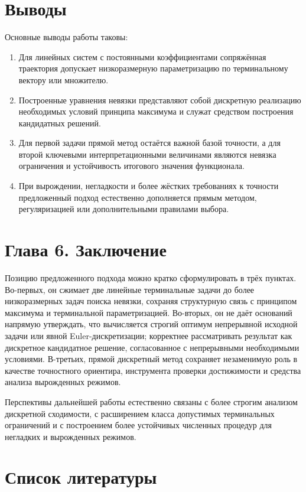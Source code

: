\documentclass[a4paper,12pt]{article}
\begin{document}
\section{Выводы}

Основные выводы работы таковы:
\begin{enumerate}
\item Для линейных систем с постоянными коэффициентами сопряжённая траектория допускает низкоразмерную параметризацию по терминальному вектору или множителю.
\item Построенные уравнения невязки представляют собой дискретную реализацию необходимых условий принципа максимума и служат средством построения кандидатных решений.
\item Для первой задачи прямой метод остаётся важной базой точности, а для второй ключевыми интерпретационными величинами являются невязка ограничения и устойчивость итогового значения функционала.
\item При вырождении, негладкости и более жёстких требованиях к точности предложенный подход естественно дополняется прямым методом, регуляризацией или дополнительными правилами выбора.
\end{enumerate}

\section{Глава 6. Заключение}

Позицию предложенного подхода можно кратко сформулировать в трёх пунктах. Во-первых, он сжимает две линейные терминальные задачи до более низкоразмерных задач поиска невязки, сохраняя структурную связь с принципом максимума и терминальной параметризацией. Во-вторых, он не даёт оснований напрямую утверждать, что вычисляется строгий оптимум непрерывной исходной задачи или явной Euler-дискретизации; корректнее рассматривать результат как дискретное кандидатное решение, согласованное с непрерывными необходимыми условиями. В-третьих, прямой дискретный метод сохраняет незаменимую роль в качестве точностного ориентира, инструмента проверки достижимости и средства анализа вырожденных режимов.

Перспективы дальнейшей работы естественно связаны с более строгим анализом дискретной сходимости, с расширением класса допустимых терминальных ограничений и с построением более устойчивых численных процедур для негладких и вырожденных режимов.

\section{Список литературы}
\end{document}
